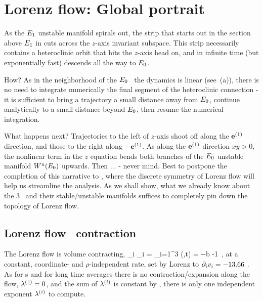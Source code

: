 \section{Lorenz flow: Global portrait}\label{exmp:LorenzGlob}

As the $\EQV{1}$ unstable manifold spirals out,
the strip that starts out in the section above $\EQV{1}$
in  cuts across the
$z$-axis invariant subspace. This strip necessarily contains a
heteroclinic orbit that hits the $z$-axis
head on, and in infinite time (but exponentially
fast) descends all the way to $\EQV{0}$.


How? As in the neighborhood of the
$\EQV{0}$ \eqv\ the dynamics is linear
(see \,(a)), there
is no need to integrate numerically the final segment
of the heteroclinic
connection - it is sufficient to bring a trajectory
a small distance away from $\EQV{0}$, continue
analytically to a small distance
beyond $\EQV{0}$,
then resume the numerical integration.

What happens next? Trajectories to the left of $z$-axis shoot
off along the $\jEigvec[1]$ direction, and those to the
right along $-\jEigvec[1]$. As along the $\jEigvec[1]$ direction
$xy >0$, the nonlinear term in the $\dot{z}$ equation 
bends both branches of the
$\EQV{0}$ unstable manifold $W^u(\EQV{0})$ upwards.
Then $\ldots$ - never mind.
Best to postpone the completion of this narrative to
, where the discrete
symmetry of Lorenz flow will help us streamline the analysis.
As we shall show, what we already know about the 3 \eqva\ and
their stable/unstable manifolds suffices to completely pin down
the topology of Lorenz flow.


\subsection{Lorenz flow \statesp\ contraction}\label{exmp:LorenzContr}

The Lorenz flow is volume contracting,
\beq
\pde_i \pVeloc_i
 = \sum_{i=1}^{3} \eigExp[i](\ssp,t)
= -\sigma -b -1
    \,,
at a constant, coordinate- and $\rho$-independent rate, set by
Lorenz to $\pde_i \pVeloc_i = -13.66$ . As for \po s and for
long time averages there is no contraction/expansion along the
flow, $\eigExp[\parallel]=0$, and the sum of $\eigExp[i]$ is
constant by , there is only one independent
exponent $\eigExp[i]$ to compute.


